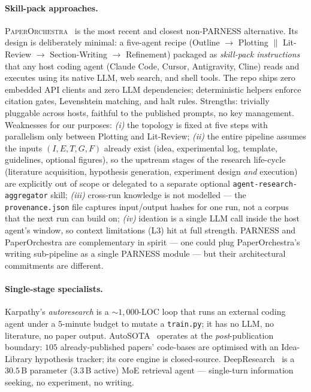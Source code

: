 \documentclass{article}
\newcommand{\parness}{\textsf{PARNESS}}
\newcommand{\code}[1]{\texttt{\small #1}}
\begin{document}
\paragraph{Skill-pack approaches.}
\textsc{PaperOrchestra}~\cite{paperorchestra} is the most recent and
closest non-\parness{} alternative. Its design is deliberately minimal: a
five-agent recipe (Outline $\rightarrow$ Plotting $\parallel$ Lit-Review
$\rightarrow$ Section-Writing $\rightarrow$ Refinement) packaged as
\emph{skill-pack instructions} that any host coding agent (Claude Code,
Cursor, Antigravity, Cline) reads and executes using its native LLM, web
search, and shell tools. The repo ships zero embedded API clients and
zero LLM dependencies; deterministic helpers enforce citation gates,
Levenshtein matching, and halt rules. Strengths: trivially pluggable
across hosts, faithful to the published prompts, no key management.
Weaknesses for our purposes: \emph{(i)} the topology is fixed at five
steps with parallelism only between Plotting and Lit-Review; \emph{(ii)}
the entire pipeline assumes the inputs $(I,E,T,G,F)$ already exist (idea,
experimental log, template, guidelines, optional figures), so the
upstream stages of the research life-cycle (literature acquisition,
hypothesis generation, experiment design \emph{and} execution) are
explicitly out of scope or delegated to a separate optional
\code{agent-research-aggregator} skill; \emph{(iii)} cross-run knowledge
is not modelled --- the \code{provenance.json} file captures input/output
hashes for one run, not a corpus that the next run can build on; \emph{(iv)}
ideation is a single LLM call inside the host agent's window, so context
limitations (L3) hit at full strength. \parness{} and PaperOrchestra are
complementary in spirit --- one could plug PaperOrchestra's writing
sub-pipeline as a single \parness{} module --- but their architectural
commitments are different.

\paragraph{Single-stage specialists.}
Karpathy's \emph{autoresearch} is a $\sim\!1{,}000$-LOC loop that runs an
external coding agent under a $5$-minute budget to mutate a
\code{train.py}; it has no LLM, no literature, no paper output.
AutoSOTA~\cite{autosota} operates at the \emph{post}-publication boundary:
$105$ already-published papers' code-bases are optimised with an
Idea-Library hypothesis tracker; its core engine is closed-source.
DeepResearch~\cite{deepresearch} is a $30.5$\,B parameter ($3.3$\,B
active) MoE retrieval agent --- single-turn information seeking, no
experiment, no writing.
\end{document}
